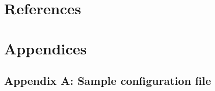 \documentclass[11pt]{article}
\begin{document}
    \section{References}
    \label{sec:references}


    \section{Appendices}
    \label{sec:appendices}

    \subsection{Appendix A: Sample configuration file}\label{subsec:appendix-a:-sample-configuration-file}

    \inputminted[bgcolor=bg,frame=lines,framesep=2mm,linenos]{yaml}{./listings/sample_config_cloc.yml}
\end{document}
